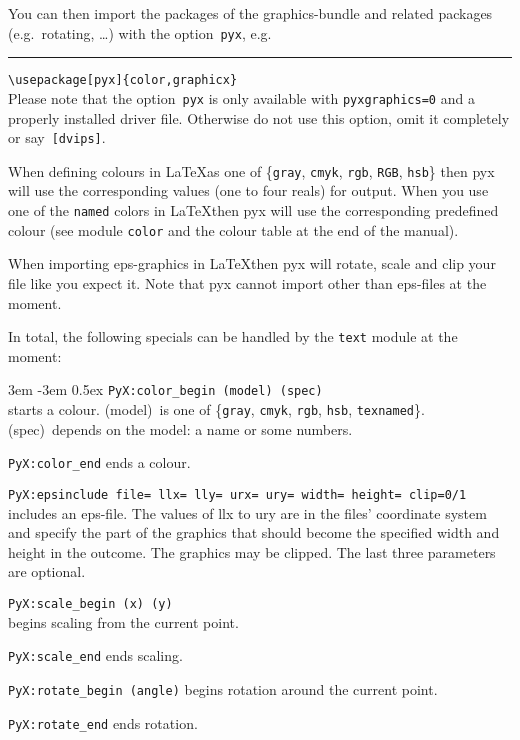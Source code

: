 You can then import the packages of the graphics-bundle and related packages
(e.g.~rotating, \ldots) with the option~\verb|pyx|, e.g.{}\\
\rule{0.1\linewidth}{0sp}\verb|\usepackage[pyx]{color,graphicx}|\\
Please note that the option~\verb|pyx| is only available with
\verb|pyxgraphics=0| and a properly installed driver file. Otherwise do not
use this option, omit it completely or say~\verb|[dvips]|.\medskip

When defining colours in \LaTeX as one of \{\verb|gray|, \verb|cmyk|,
\verb|rgb|, \verb|RGB|, \verb|hsb|\} then pyx will use the corresponding
values (one to four reals) for output. When you use one of the \verb|named|
colors in \LaTeX then pyx will use the corresponding predefined colour (see
module \verb|color| and the colour table at the end of the manual).

When importing eps-graphics in \LaTeX then pyx will rotate, scale and clip
your file like you expect it. Note that pyx cannot import other than eps-files
at the moment.\medskip

In total, the following specials can be handled by the \verb|text| module at
the moment:\medskip

\begingroup
\leftskip3em
\parindent-3em
\parskip0.5ex
\texttt{PyX:color\_begin (model) (spec)}\\
  starts a colour. (model)~is one of
  \{\verb|gray|, \verb|cmyk|, \verb|rgb|, \verb|hsb|, \verb|texnamed|\}.
  (spec)~depends on the model: a name or some numbers.\par
\texttt{PyX:color\_end} ends a colour.\par
\texttt{PyX:epsinclude file= llx= lly= urx= ury= width= height= clip=0/1}\\
  includes an eps-file. The values of llx to ury are in the files' coordinate
  system and specify the part of the graphics that should become the specified
  width and height in the outcome. The graphics may be clipped. The last three
  parameters are optional.\par
\texttt{PyX:scale\_begin (x) (y)}\\
  begins scaling from the current point.\par
\texttt{PyX:scale\_end} ends scaling.\par
\texttt{PyX:rotate\_begin (angle)} begins rotation around the current
  point.\par
\texttt{PyX:rotate\_end} ends rotation.\par
\endgroup


